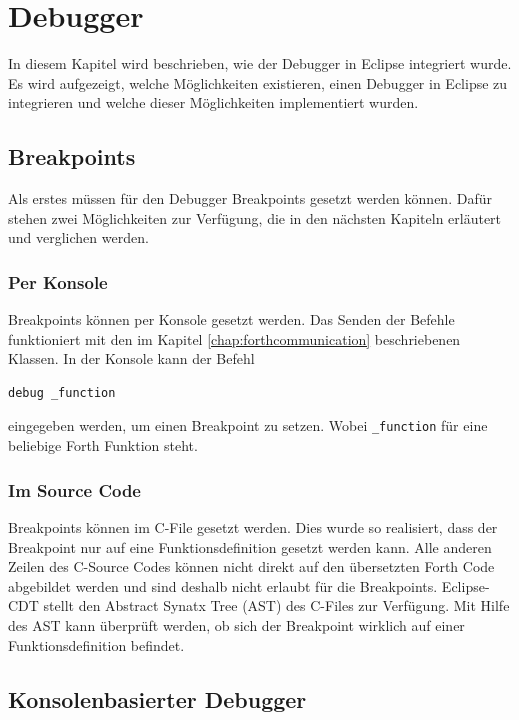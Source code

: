 \chapter{Debugger}
\label{chap:debugger}
In diesem Kapitel wird beschrieben, wie der Debugger in Eclipse integriert wurde. Es wird aufgezeigt, welche Möglichkeiten existieren, einen Debugger in Eclipse zu integrieren und welche dieser Möglichkeiten implementiert wurden.

\section{Breakpoints}
Als erstes müssen für den Debugger Breakpoints gesetzt werden können. Dafür stehen zwei Möglichkeiten zur Verfügung, die in den nächsten Kapiteln erläutert und verglichen werden.

\subsection{Per Konsole}

Breakpoints können per Konsole gesetzt werden. Das Senden der Befehle funktioniert mit den im Kapitel \ref{chap:forthcommunication} beschriebenen Klassen. In der Konsole kann der Befehl

%
\begin{verbatim}
debug _function
\end{verbatim}
%
eingegeben werden, um einen Breakpoint zu setzen. Wobei \verb!_function! für eine beliebige Forth Funktion steht.

\subsection{Im Source Code}

Breakpoints können im C-File gesetzt werden. Dies wurde so realisiert, dass der Breakpoint nur auf eine Funktionsdefinition gesetzt werden kann. Alle anderen Zeilen des C-Source Codes können nicht direkt auf den übersetzten Forth Code abgebildet werden und sind deshalb nicht erlaubt für die Breakpoints.
\newline
Eclipse-CDT stellt den Abstract Synatx Tree (AST) des C-Files zur Verfügung. Mit Hilfe des AST kann überprüft werden, ob sich der Breakpoint wirklich auf einer Funktionsdefinition befindet.
\newpage
\section{Konsolenbasierter Debugger}

